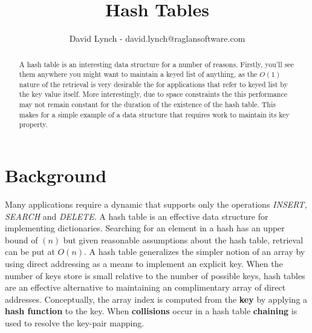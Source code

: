 \documentclass[10pt,a4paper]{article}
\title{Hash Tables}
\author{David Lynch - david.lynch@raglansoftware.com }
\begin{document}
\maketitle
\begin{abstract}
A hash table is an interesting data structure for a number of reasons. Firstly, you'll see them anywhere you might want to maintain a keyed list of anything, as the $O(1)$ nature of the retrieval is very desirable the for applications that refer to keyed list by the key value itself. More interestingly, due to space constraints the this performance may not remain constant for the duration of the existence of the hash table. This makes for a simple example of a data structure that requires work to maintain its key property. 
\end{abstract}
\section{Background}
Many applications require a dynamic that supports only the operations {\it INSERT, SEARCH} and {\it DELETE}. A hash table is an effective data structure for implementing dictionaries. Searching for an element in a hash has an upper bound of \Theta$(n)$ but given reasonable assumptions about the hash table, retrieval can be put at $O(n)$. A hash table generalizes the simpler notion of an array by using direct addressing as a means to implement an explicit key. When the number of keys store is small relative to the number of possible keys, hash tables are an effective alternative to maintaining an complimentary array of direct addresses. Conceptually, the array index is computed from the {\bf key} by applying a {\bf hash function} to the key. When {\bf collisions} occur in a hash table {\bf chaining} is used to resolve the key-pair mapping. 
\end{document}

